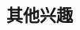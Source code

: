 \documentclass[11pt,a4paper]{moderncv}
\begin{document}
\begin{CJK}{UTF8}{gkai}
\section{其他兴趣}


\closesection{}
\end{CJK}
\end{document}
